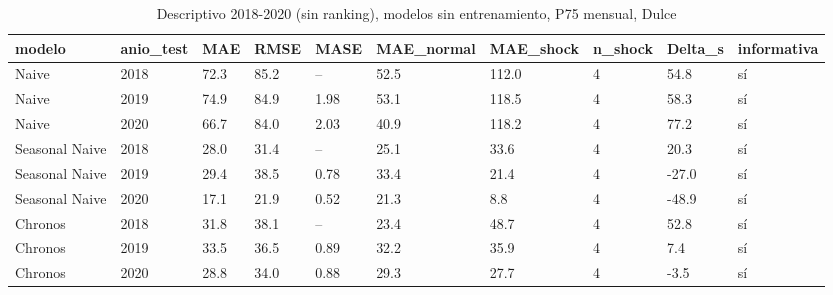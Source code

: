 \begin{table}[H]
\centering
\small
\caption{Descriptivo 2018-2020 (sin ranking), modelos sin entrenamiento, P75 mensual, Dulce}
\label{tab:T17_descriptivo_2018_2020_dulce}
\begin{tabular}{llllllllll}
\toprule
modelo & anio\_test & MAE & RMSE & MASE & MAE\_normal & MAE\_shock & n\_shock & Delta\_s & informativa \\
\midrule
Naive & 2018 & 72.3 & 85.2 & -- & 52.5 & 112.0 & 4 & 54.8 & sí \\
Naive & 2019 & 74.9 & 84.9 & 1.98 & 53.1 & 118.5 & 4 & 58.3 & sí \\
Naive & 2020 & 66.7 & 84.0 & 2.03 & 40.9 & 118.2 & 4 & 77.2 & sí \\
Seasonal Naive & 2018 & 28.0 & 31.4 & -- & 25.1 & 33.6 & 4 & 20.3 & sí \\
Seasonal Naive & 2019 & 29.4 & 38.5 & 0.78 & 33.4 & 21.4 & 4 & -27.0 & sí \\
Seasonal Naive & 2020 & 17.1 & 21.9 & 0.52 & 21.3 & 8.8 & 4 & -48.9 & sí \\
Chronos & 2018 & 31.8 & 38.1 & -- & 23.4 & 48.7 & 4 & 52.8 & sí \\
Chronos & 2019 & 33.5 & 36.5 & 0.89 & 32.2 & 35.9 & 4 & 7.4 & sí \\
Chronos & 2020 & 28.8 & 34.0 & 0.88 & 29.3 & 27.7 & 4 & -3.5 & sí \\
\bottomrule
\end{tabular}
\end{table}